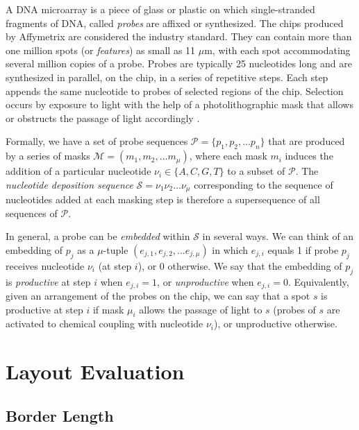 \documentclass{llncs}
\begin{document}
A DNA microarray is a piece of glass or plastic on which single-stranded fragments of DNA, called \emph{probes} are affixed or synthesized. The chips produced by Affymetrix are considered the industry standard. They can contain more than one million spots (or \emph{features}) as small as 11 $\mu$m, with each spot accommodating several million copies of a probe. Probes are typically 25 nucleotides long and are synthesized in parallel, on the chip, in a series of repetitive steps. Each step appends the same nucleotide to probes of selected regions of the chip. Selection occurs by exposure to light with the help of a photolithographic mask that allows or obstructs the passage of light accordingly \cite{FODOR91}.

Formally, we have a set of probe sequences $\mathcal{P} = \{p_{1}, p_{2}, ... p_{n}\}$ that are produced by a series of masks $\mathcal{M} = (m_{1}, m_{2}, ... m_{\mu})$, where each mask $m_{i}$ induces the addition of a particular nucleotide $\nu_{i} \in \{A, C, G, T\}$ to a subset of $\mathcal{P}$. The \emph{nucleotide deposition sequence} $\mathcal{S} = \nu_{1} \nu_{2} \ldots \nu_{\mu}$ corresponding to the sequence of nucleotides added at each masking step is therefore a supersequence of all sequences of $\mathcal{P}$.

In general, a probe can be \emph{embedded} within $\mathcal{S}$ in several ways. We can think of an embedding of $p_{j}$ as a $\mu$-tuple $(e_{j,1}, e_{j,2}, ... e_{j,\mu})$ in which $e_{j,i}$ equals 1 if probe $p_{j}$ receives nucleotide $\nu_{i}$ (at step $i$), or 0 otherwise. We say that the embedding of $p_{j}$ is \emph{productive} at step $i$ when $e_{j,i} = 1$, or \emph{unproductive} when $e_{j,i} = 0$. Equivalently, given an arrangement of the probes on the chip, we can say that a spot $s$ is productive at step $i$ if mask $\mu_{i}$ allows the passage of light to $s$ (probes of $s$ are activated to chemical coupling with nucleotide $\nu_{i}$), or unproductive otherwise.

\section{Layout Evaluation}

\subsection{Border Length}
\end{document}
